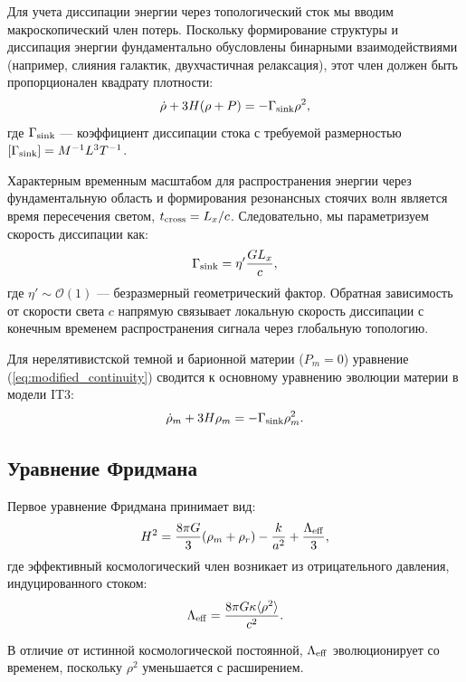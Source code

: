 \documentclass[12pt,a4paper]{article}
\begin{document}
Для учета диссипации энергии через топологический сток мы вводим макроскопический член потерь. Поскольку формирование структуры и диссипация энергии фундаментально обусловлены бинарными взаимодействиями (например, слияния галактик, двухчастичная релаксация), этот член должен быть пропорционален квадрату плотности:
\begin{equation}
\dot{\rho} + 3H(\rho + P) = -\Gamma_{\rm sink} \rho^2,
\label{eq:modified_continuity}
\end{equation}
где $\Gamma_{\rm sink}$ — коэффициент диссипации стока с требуемой размерностью $[\Gamma_{\rm sink}] = M^{-1} L^3 T^{-1}$.

Характерным временным масштабом для распространения энергии через фундаментальную область и формирования резонансных стоячих волн является время пересечения светом, $t_{\rm cross} = L_x/c$. Следовательно, мы параметризуем скорость диссипации как:
\begin{equation}
\Gamma_{\rm sink} = \eta' \frac{G L_x}{c},
\label{eq:gamma_sink}
\end{equation}
где $\eta' \sim \mathcal{O}(1)$ — безразмерный геометрический фактор. Обратная зависимость от скорости света $c$ напрямую связывает локальную скорость диссипации с конечным временем распространения сигнала через глобальную топологию.

Для нерелятивистской темной и барионной материи ($P_m = 0$) уравнение (\ref{eq:modified_continuity}) сводится к основному уравнению эволюции материи в модели IT3:
\begin{equation}
\dot{\rho}_m + 3H\rho_m = -\Gamma_{\rm sink} \rho_m^2.
\label{eq:matter_cont}
\end{equation}

\subsection{Уравнение Фридмана}

Первое уравнение Фридмана принимает вид:
\begin{equation}
H^2 = \frac{8\pi G}{3}(\rho_m + \rho_r) - \frac{k}{a^2} + \frac{\Lambda_{\rm eff}}{3},
\end{equation}
где эффективный космологический член возникает из отрицательного давления, индуцированного стоком:
\begin{equation}
\Lambda_{\rm eff} = \frac{8\pi G \kappa \langle \rho^2 \rangle}{c^2}.
\end{equation}

В отличие от истинной космологической постоянной, $\Lambda_{\rm eff}$ эволюционирует со временем, поскольку $\rho^2$ уменьшается с расширением.
\end{document}

